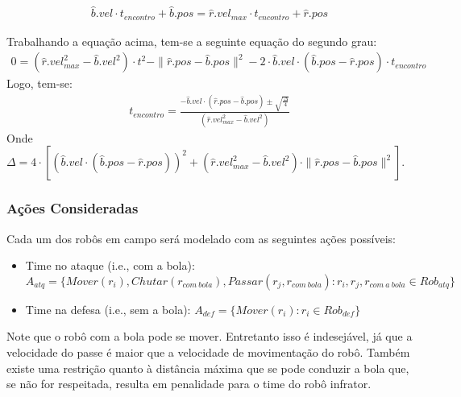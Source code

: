 \begin{gather}
  \hat{b}.vel \cdot t_{encontro} + \hat{b}.pos = \hat{r}.vel_{max} \cdot t_{encontro} + \hat{r}.pos
\end{gather}

Trabalhando a equação acima, tem-se a seguinte equação do segundo grau:
\begin{gather}  
  0 = (\hat{r}.vel^2_{max}-\hat{b}.vel^2) \cdot t^2 - \parallel \hat{r}.pos - \hat{b}.pos \parallel ^2
     - 2 \cdot \hat{b}.vel \cdot (\hat{b}.pos - \hat{r}.pos) \cdot t_{encontro}
\end{gather}
Logo, tem-se:
\begin{gather}  
  \boxed{t_{encontro} = \frac{ - \hat{b}.vel \cdot (\hat{r}.pos - \hat{b}.pos) \pm \sqrt {\frac{\Delta}{4}}}
                 {(\hat{r}.vel^2_{max} - \hat{b}.vel^2)}}
\end{gather}
Onde $\Delta = 4 \cdot [ ( \hat{b}.vel \cdot (\hat{b}.pos - \hat{r}.pos)) ^2 +
           (\hat{r}.vel_{max}^2 - \hat{b}.vel^2) \cdot \parallel \hat{r}.pos - \hat{b}.pos \parallel ^2]$.

\subsubsection{Ações Consideradas}
Cada um dos robôs em campo será modelado com as seguintes ações possíveis:
\begin{itemize}
  \item Time no ataque (i.e., com a bola):\\
        $A_{atq} = \lbrace Mover(r_i), Chutar(r_{com{\ }bola}), Passar(r_j,r_{com{\ }bola}):
                    r_i, r_j, r_{com{\ }a{\ }bola} \in Rob_{atq}\rbrace$

  \item Time na defesa (i.e., sem a bola):
        $A_{def} = \lbrace Mover(r_i): r_i \in Rob_{def}\rbrace$
\end{itemize}


Note que o robô com a bola pode se mover. Entretanto isso é indesejável, já que
a velocidade do passe é maior que a velocidade de movimentação do robô. Também
existe uma restrição quanto à distância máxima que se pode conduzir a bola que,
se não for respeitada, resulta em penalidade para o time do robô infrator.

